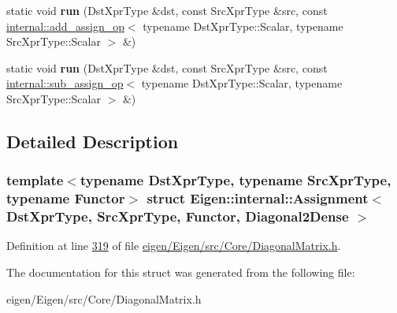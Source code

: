 \begin{DoxyCompactItemize}
\item 
\mbox{\label{struct_eigen_1_1internal_1_1_assignment_3_01_dst_xpr_type_00_01_src_xpr_type_00_01_functor_00_01_diagonal2_dense_01_4_a4267da91867006719a3767e13c44098c}} 
static void {\bfseries run} (Dst\+Xpr\+Type \&dst, const Src\+Xpr\+Type \&src, const \hyperlink{struct_eigen_1_1internal_1_1add__assign__op}{internal\+::add\+\_\+assign\+\_\+op}$<$ typename Dst\+Xpr\+Type\+::\+Scalar, typename Src\+Xpr\+Type\+::\+Scalar $>$ \&)
\item 
\mbox{\label{struct_eigen_1_1internal_1_1_assignment_3_01_dst_xpr_type_00_01_src_xpr_type_00_01_functor_00_01_diagonal2_dense_01_4_a08f8787f00a2ea39eea1e0d2d64cb2a4}} 
static void {\bfseries run} (Dst\+Xpr\+Type \&dst, const Src\+Xpr\+Type \&src, const \hyperlink{struct_eigen_1_1internal_1_1sub__assign__op}{internal\+::sub\+\_\+assign\+\_\+op}$<$ typename Dst\+Xpr\+Type\+::\+Scalar, typename Src\+Xpr\+Type\+::\+Scalar $>$ \&)
\end{DoxyCompactItemize}


\subsection{Detailed Description}
\subsubsection*{template$<$typename Dst\+Xpr\+Type, typename Src\+Xpr\+Type, typename Functor$>$\newline
struct Eigen\+::internal\+::\+Assignment$<$ Dst\+Xpr\+Type, Src\+Xpr\+Type, Functor, Diagonal2\+Dense $>$}



Definition at line \hyperlink{eigen_2_eigen_2src_2_core_2_diagonal_matrix_8h_source_l00319}{319} of file \hyperlink{eigen_2_eigen_2src_2_core_2_diagonal_matrix_8h_source}{eigen/\+Eigen/src/\+Core/\+Diagonal\+Matrix.\+h}.



The documentation for this struct was generated from the following file\+:\begin{DoxyCompactItemize}
\item 
eigen/\+Eigen/src/\+Core/\+Diagonal\+Matrix.\+h\end{DoxyCompactItemize}
